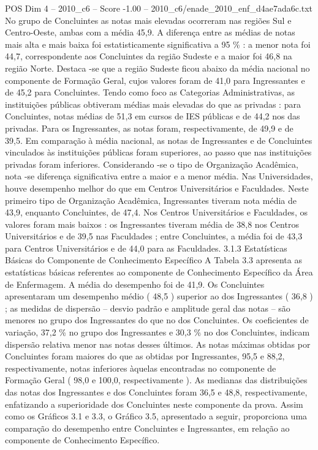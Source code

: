 \begin{textsample}{POS Dim 4 – 2010\_c6 – Score -1.00 – 2010\_c6/enade\_2010\_enf\_d4ae7ada6c.txt}
No grupo de Concluintes as notas mais elevadas ocorreram nas regiões Sul e Centro-Oeste, ambas com a média 45,9.
A diferença entre as médias de notas mais alta e mais baixa foi estatisticamente significativa a 95 \% : a menor nota foi 44,7, correspondente aos Concluintes da região Sudeste e a maior foi 46,8 na região Norte.
Destaca -se que a região Sudeste ficou abaixo da média nacional no componente de Formação Geral, cujos valores foram de 41,0 para Ingressantes e de 45,2 para Concluintes.
Tendo como foco as Categorias Administrativas, as instituições públicas obtiveram médias mais elevadas do que as privadas : para Concluintes, notas médias de 51,3 em cursos de IES públicas e de 44,2 nos das privadas.
Para os Ingressantes, as notas foram, respectivamente, de 49,9 e de 39,5.
Em comparação à média nacional, as notas de Ingressantes e de Concluintes vinculados às instituições públicas foram superiores, ao passo que nas instituições privadas foram inferiores.
Considerando -se o tipo de Organização Acadêmica, nota -se diferença significativa entre a maior e a menor média.
Nas Universidades, houve desempenho melhor do que em Centros Universitários e Faculdades.
Neste primeiro tipo de Organização Acadêmica, Ingressantes tiveram nota média de 43,9, enquanto Concluintes, de 47,4.
Nos Centros Universitários e Faculdades, os valores foram mais baixos : os Ingressantes tiveram média de 38,8 nos Centros Universitários e de 39,5 nas Faculdades ; entre Concluintes, a média foi de 43,3 para Centros Universitários e de 44,0 para as Faculdades. 3.1.3 Estatísticas Básicas do Componente de Conhecimento Específico A Tabela 3.3 apresenta as estatísticas básicas referentes ao componente de Conhecimento Específico da Área de Enfermagem.
A média do desempenho foi de 41,9.
Os Concluintes apresentaram um desempenho médio ( 48,5 ) superior ao dos Ingressantes ( 36,8 ) ; as medidas de dispersão – desvio padrão e amplitude geral das notas – são menores no grupo dos Ingressantes do que no dos Concluintes.
Os coeficientes de variação, 37,2 \% no grupo dos Ingressantes e 30,3 \% no dos Concluintes, indicam dispersão relativa menor nas notas desses últimos.
As notas máximas obtidas por Concluintes foram maiores do que as obtidas por Ingressantes, 95,5 e 88,2, respectivamente, notas inferiores àquelas encontradas no componente de Formação Geral ( 98,0 e 100,0, respectivamente ).
As medianas das distribuições das notas dos Ingressantes e dos Concluintes foram 36,5 e 48,8, respectivamente, enfatizando a superioridade dos Concluintes neste componente da prova.
Assim como os Gráficos 3.1 e 3.3, o Gráfico 3.5, apresentado a seguir, proporciona uma comparação do desempenho entre Concluintes e Ingressantes, em relação ao componente de Conhecimento Específico.

\end{textsample}
